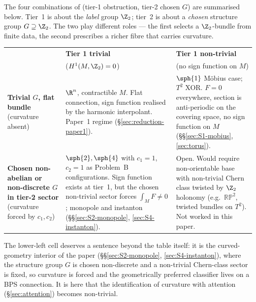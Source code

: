 The four combinations of (tier-1 obstruction, tier-2 chosen $G$)
are summarised below. Tier~1 is about the \emph{label} group
$\Z_2$; tier~2 is about a \emph{chosen} structure group
$G\supseteq\Z_2$. The two play different roles --- the first
selects a $\Z_2$-bundle from finite data, the second prescribes
a richer fibre that carries curvature.

\medskip
\begin{center}
\renewcommand{\arraystretch}{1.5}
\begin{tabular}{|p{2.6cm}|p{5cm}|p{5cm}|}
\hline
 & \textbf{Tier 1 trivial} & \textbf{Tier 1 non-trivial}\\
 & \small{($H^1(M,\Z_2)=0$)} & \small{(no sign function on $M$)}\\
\hline
\textbf{Trivial $G$, flat bundle}
\newline\small{(curvature absent)}
&
$\R^n$, contractible $M$. Flat connection, sign function realised
by the harmonic interpolant. Paper~1 regime
(\S\ref{sec:reduction-paper1}).
&
$\sph{1}$ M\"obius case; $T^2$ XOR. $F=0$ everywhere, section is
anti-periodic on the covering space, no sign function on $M$
(\S\S\ref{sec:S1-mobius}, \ref{sec:torus}).
\\
\hline
\textbf{Chosen non-abelian or non-discrete $G$ in tier-2 sector}
\newline\small{(curvature forced by $c_1, c_2$)}
&
$\sph{2}, \sph{4}$ with $c_1=1$, $c_2=1$ as Problem~B
configurations. Sign function exists at tier~1, but the chosen
non-trivial sector forces $\int_M F\neq 0$; monopole and instanton
(\S\S\ref{sec:S2-monopole}, \ref{sec:S4-instanton}).
&
Open. Would require non-orientable base with non-trivial Chern
class twisted by $\Z_2$ holonomy (e.g.\ $\mathbb{RP}^2$, twisted
bundles on $T^2$). Not worked in this paper.
\\
\hline
\end{tabular}
\end{center}
\medskip

The lower-left cell deserves a sentence beyond the table itself: it
is the curved-geometry interior of the paper
(\S\S\ref{sec:S2-monopole}, \ref{sec:S4-instanton}), where the
structure group $G$ is chosen non-discrete and a non-trivial
Chern-class sector is fixed, so curvature is forced and the
geometrically preferred classifier lives on a BPS connection. It is
here that the identification of curvature with attention
(\S\ref{sec:attention}) becomes non-trivial.


